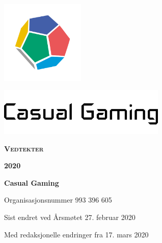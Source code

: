\begin{titlepage}
    \centering
    \vspace*{1cm}
    \includegraphics[width=4cm]{innhold/logo-terning.png}\par
    \includegraphics[width=8cm]{innhold/logo-tekst.png}\par
    \vspace*{4cm}
    {\rmfamily\Huge\bfseries\scshape Vedtekter}\par
    \vspace*{0.5cm}
    {\rmfamily\LARGE\bfseries\scshape 2020}\par
    \vfill
    {\bfseries Casual Gaming}\par
    \vspace*{0.5cm}
    {Organisasjonsnummer 993 396 605}\par
    \vspace*{0.5cm}
    {Sist endret ved Årsmøtet 27. februar 2020}\par
    \vspace*{0.5cm}
    {Med redaksjonelle endringer fra 17. mars 2020}\par
\end{titlepage}
